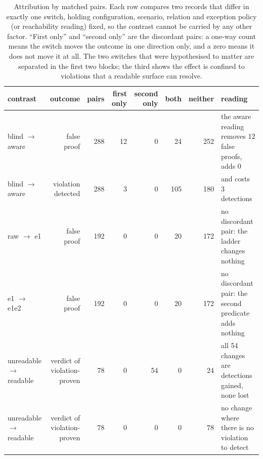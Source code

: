 \begin{table}[t]
\centering
\caption{Attribution by matched pairs. Each row compares two records that differ in exactly one switch, holding configuration, scenario, relation and exception policy (or reachability reading) fixed, so the contrast cannot be carried by any other factor. ``First only'' and ``second only'' are the discordant pairs: a one-way count means the switch moves the outcome in one direction only, and a zero means it does not move it at all. The two switches that were hypothesised to matter are separated in the first two blocks; the third shows the effect is confined to violations that a readable surface can resolve.}
\label{tab:attribution}
\small
\setlength{\tabcolsep}{4pt}
\begin{tabular}{@{}lrrrrrrp{}@{}}
\toprule
contrast & outcome & pairs & first only & second only & both & neither & reading \\
\midrule
blind $\rightarrow$ aware & false proof & 288 & 12 & 0 & 24 & 252 & the aware reading removes 12 false proofs, adds 0 \\
blind $\rightarrow$ aware & violation detected & 288 & 3 & 0 & 105 & 180 & and costs 3 detections \\
\addlinespace[3pt]
raw $\rightarrow$ e1 & false proof & 192 & 0 & 0 & 20 & 172 & no discordant pair: the ladder changes nothing \\
e1 $\rightarrow$ e1e2 & false proof & 192 & 0 & 0 & 20 & 172 & no discordant pair: the second predicate adds nothing \\
\addlinespace[3pt]
unreadable $\rightarrow$ readable & verdict of violation-proven & 78 & 0 & 54 & 0 & 24 & all 54 changes are detections gained, none lost \\
unreadable $\rightarrow$ readable & verdict of violation-proven & 78 & 0 & 0 & 0 & 78 & no change where there is no violation to detect \\
\bottomrule
\end{tabular}
\end{table}
